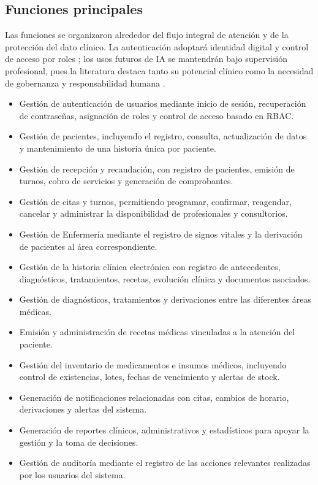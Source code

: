 \documentclass[11pt,a4paper]{article}
\begin{document}
	\subsection{Funciones principales}
	
	Las funciones se organizaron alrededor del flujo integral de atención y de la
	protección del dato clínico. La autenticación adoptará identidad digital y
	control de acceso por roles \cite{nist80063,sandhu2000}; los usos futuros de IA
	se mantendrán bajo supervisión profesional, pues la literatura destaca tanto su
	potencial clínico como la necesidad de gobernanza y responsabilidad humana
	\cite{rajkomar2019,topol2019}.
	
	\begin{itemize}
		\item Gestión de autenticación de usuarios mediante inicio de sesión, recuperación de contraseñas, asignación de roles y control de acceso basado en RBAC.
		
		\item Gestión de pacientes, incluyendo el registro, consulta, actualización de datos y mantenimiento de una historia única por paciente.
		
		\item Gestión de recepción y recaudación, con registro de pacientes, emisión de turnos, cobro de servicios y generación de comprobantes.
		
		\item Gestión de citas y turnos, permitiendo programar, confirmar, reagendar, cancelar y administrar la disponibilidad de profesionales y consultorios.
		
		\item Gestión de Enfermería mediante el registro de signos vitales y la derivación de pacientes al área correspondiente.
		
		\item Gestión de la historia clínica electrónica con registro de antecedentes, diagnósticos, tratamientos, recetas, evolución clínica y documentos asociados.
		
		\item Gestión de diagnósticos, tratamientos y derivaciones entre las diferentes áreas médicas.
		
		\item Emisión y administración de recetas médicas vinculadas a la atención del paciente.
		
		\item Gestión del inventario de medicamentos e insumos médicos, incluyendo control de existencias, lotes, fechas de vencimiento y alertas de stock.
		
		\item Generación de notificaciones relacionadas con citas, cambios de horario, derivaciones y alertas del sistema.
		
		\item Generación de reportes clínicos, administrativos y estadísticos para apoyar la gestión y la toma de decisiones.
		
		\item Gestión de auditoría mediante el registro de las acciones relevantes realizadas por los usuarios del sistema.
	\end{itemize}
	
\end{document}
